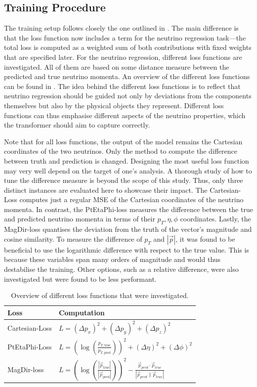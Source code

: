 \subsection{Training Procedure}
\label{sec:regression:training-procedure}
The training setup follows closely the one outlined in . The main difference is that the loss function now includes a term for the neutrino regression task—the total loss is computed as a weighted sum of both contributions with fixed weights that are specified later. For the neutrino regression, different loss functions are investigated. All of them are based on some distance measure between the predicted and true neutrino momenta. An overview of the different loss functions can be found in . The idea behind the different loss functions is to reflect that neutrino regression should be guided not only by deviations from the components themselves but also by the physical objects they represent. Different loss functions can thus emphasise different aspects of the neutrino properties, which the transformer should aim to capture correctly.

Note that for all loss functions, the output of the model remains the Cartesian coordinates of the two neutrinos. Only the method to compute the difference between truth and prediction is changed.
Designing the most useful loss function may very well depend on the target of one's analysis. A thorough study of how to tune the difference measure is beyond the scope of this study. Thus, only three distinct instances are evaluated here to showcase their impact. The Cartesian-Loss computes just a regular MSE of the Cartesian coordinates of the neutrino momenta. In contrast, the PtEtaPhi-loss measures the difference between the true and predicted neutrino momenta in terms of their $p_T,\eta,\phi$ coordinates. Lastly, the MagDir-loss quantises the deviation from the truth of the vector's magnitude and cosine similarity. To measure the difference of $p_T$ and $|\vec p|$, it was found to be beneficial to use the logarithmic difference with respect to the true value. This is because these variables span many orders of magnitude and would thus destabilise the training.
Other options, such as a relative difference, were also investigated but were found to be less performant.
\begin{table}[ht]
    \centering
    \caption{Overview of different loss functions that were investigated.}
    \begin{tabular}{ll}
        \toprule Loss & Computation \\
        \midrule Cartesian-Loss & $L=(\Delta p_x)^2+ (\Delta p_y)^2+(\Delta p_z)^2$ \\
        PtEtaPhi-Loss & $L=\left(\log\left(\frac{p_{T,\text{true}}}{p_{T,\text{pred}}}\right)\right)^2+(\Delta \eta)^2+(\Delta\phi)^2$\\
        MagDir-loss& $L=\left(\log\left(\frac{|\vec p_{\text{true}}|}{|\vec p_{\text{pred}}|}\right)\right)^2-\frac{\vec p_{pred}\cdot\vec p_{true}}{|\vec p_{pred}\|\vec p_{true}|}$ \\
        \bottomrule
    \end{tabular}
    \label{tab:loss-function}
\end{table}%

